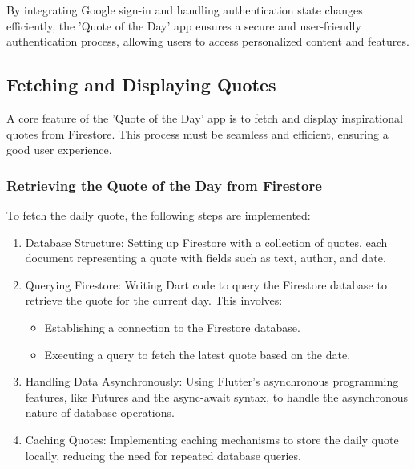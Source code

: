 \documentclass{book}
\begin{document}
By integrating Google sign-in and handling authentication state changes efficiently, the 'Quote of the Day' app ensures a secure and user-friendly authentication process, allowing users to access personalized content and features.

\subsection{Fetching and Displaying Quotes}
A core feature of the 'Quote of the Day' app is to fetch and display inspirational quotes from Firestore. This process must be seamless and efficient, ensuring a good user experience.

\subsubsection{Retrieving the Quote of the Day from Firestore}
To fetch the daily quote, the following steps are implemented:
\begin{enumerate}
    \item Database Structure: Setting up Firestore with a collection of quotes, each document representing a quote with fields such as text, author, and date.
    \item Querying Firestore: Writing Dart code to query the Firestore database to retrieve the quote for the current day. This involves:
    \begin{itemize}
        \item Establishing a connection to the Firestore database.
        \item Executing a query to fetch the latest quote based on the date.
    \end{itemize}
    \item Handling Data Asynchronously: Using Flutter's asynchronous programming features, like Futures and the async-await syntax, to handle the asynchronous nature of database operations.
    \item Caching Quotes: Implementing caching mechanisms to store the daily quote locally, reducing the need for repeated database queries.
\end{enumerate}
\end{document}
